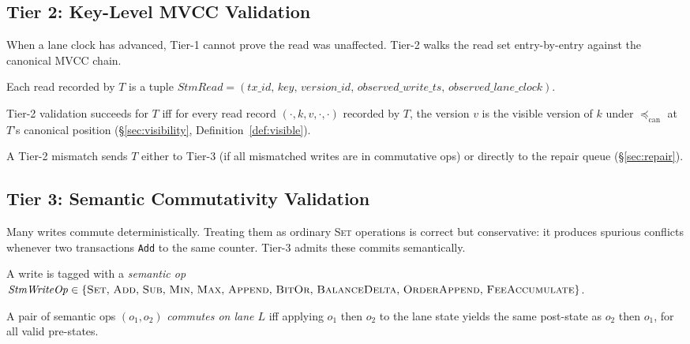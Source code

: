 \subsection{Tier 2: Key-Level MVCC Validation}

When a lane clock has advanced, Tier-1 cannot prove the read was
unaffected. Tier-2 walks the read set entry-by-entry against the
canonical MVCC chain.

\begin{definition}
\label{def:read-record}
Each read recorded by $T$ is a tuple
$\mathit{StmRead} = (\mathit{tx\_id},\, \mathit{key},\,
\mathit{version\_id},\, \mathit{observed\_write\_ts},\,
\mathit{observed\_lane\_clock})$.
\end{definition}

\begin{definition}
\label{def:tier2}
Tier-2 validation succeeds for $T$ iff for every read record
$(\cdot, k, v, \cdot, \cdot)$ recorded by $T$, the version $v$ is
the visible version of $k$ under $\preceq_{\mathrm{can}}$ at $T$'s
canonical position (\S\ref{sec:visibility}, Definition~\ref{def:visible}).
\end{definition}

A Tier-2 mismatch sends $T$ either to Tier-3 (if all mismatched writes
are in commutative ops) or directly to the repair queue
(\S\ref{sec:repair}).

\subsection{Tier 3: Semantic Commutativity Validation}

Many writes commute deterministically. Treating them as ordinary
\textsc{Set} operations is correct but conservative: it produces
spurious conflicts whenever two transactions \texttt{Add} to the same
counter. Tier-3 admits these commits semantically.

\begin{definition}
\label{def:semantic-op}
A write is tagged with a \emph{semantic op}
$\mathit{StmWriteOp} \in \{\textsc{Set},\, \textsc{Add},\, \textsc{Sub},\,
\textsc{Min},\, \textsc{Max},\, \textsc{Append},\, \textsc{BitOr},\,
\textsc{BalanceDelta},\, \textsc{OrderAppend},\,
\textsc{FeeAccumulate}\}$.
\end{definition}

\begin{definition}
\label{def:commutative}
A pair of semantic ops $(o_1, o_2)$ \emph{commutes on lane $L$}
iff applying $o_1$ then $o_2$ to the lane state yields the same
post-state as $o_2$ then $o_1$, for all valid pre-states.
\end{definition}

